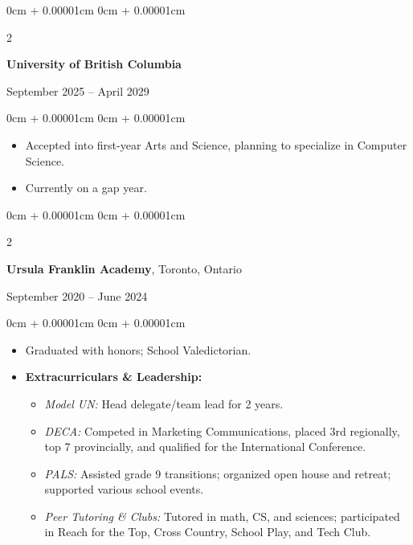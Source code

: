 \documentclass[10pt, letterpaper]{article}
\newenvironment{highlights}{
    \begin{itemize}[
        topsep=0.10cm,
        parsep=0.10cm,
        partopsep=0pt,
        itemsep=0pt,
        leftmargin=0cm + 10pt
    ]
}{
    \end{itemize}
}
\newenvironment{onecolentry}{
    \begin{adjustwidth}{
        0cm + 0.00001cm
    }{
        0cm + 0.00001cm
    }
}{
    \end{adjustwidth}
}
\newenvironment{twocolentry}[2][]{
    \onecolentry
    \def\secondColumn{#2}
    \setcolumnwidth{\fill, 5.5 cm} %
    \begin{paracol}{2}
}{
    \switchcolumn \raggedleft \secondColumn
    \end{paracol}
    \endonecolentry
}
\begin{document}
    \begin{twocolentry}{September 2025 – April 2029}
        \textbf{University of British Columbia}
    \end{twocolentry}
    \vspace{0.10cm}
    \begin{onecolentry}
        \begin{highlights}
            \item Accepted into first-year Arts and Science, planning to specialize in Computer Science.
            \item Currently on a gap year.
        \end{highlights}
    \end{onecolentry}

    \vspace{0.2cm}

    \begin{twocolentry}{September 2020 – June 2024}
    \textbf{Ursula Franklin Academy}, Toronto, Ontario
    \end{twocolentry}
    \vspace{0.10cm}
    \begin{onecolentry}
        \begin{highlights}
            \item Graduated with honors; School Valedictorian.
            \item \textbf{Extracurriculars \& Leadership:}
                \begin{itemize}[leftmargin=15pt]
                    \item \textit{Model UN:} Head delegate/team lead for 2 years.
                    \item \textit{DECA:} Competed in Marketing Communications, placed 3rd regionally, top 7 provincially, and qualified for the International Conference.
                    \item \textit{PALS:} Assisted grade 9 transitions; organized open house and retreat; supported various school events.
                    \item \textit{Peer Tutoring \& Clubs:} Tutored in math, CS, and sciences; participated in Reach for the Top, Cross Country, School Play, and Tech Club.
                \end{itemize}
        \end{highlights}
    \end{onecolentry}
\end{document}
